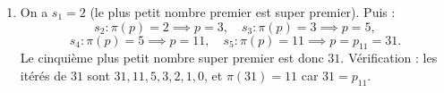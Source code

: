\begin{enumerate}
\item On a \(s_1 = 2\) (le plus petit nombre premier est super premier). Puis :
\[
s_2 : \pi(p) = 2 \implies p = 3,\quad s_3 : \pi(p) = 3 \implies p = 5,
\]
\[
s_4 : \pi(p) = 5 \implies p = 11,\quad s_5 : \pi(p) = 11 \implies p = p_{11} = 31.
\]
Le cinquième plus petit nombre super premier est donc \(31\). Vérification : les itérés de \(31\) sont \(31, 11, 5, 3, 2, 1, 0\), et \(\pi(31) = 11\) car \(31 = p_{11}\).
\end{enumerate}
